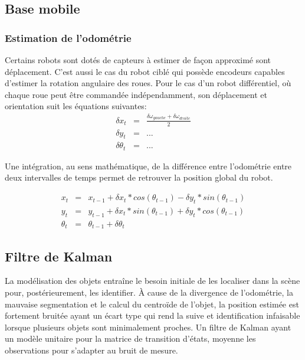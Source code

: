 \subsection{Base mobile}

\subsubsection{Estimation de l'odométrie}

Certains robots sont dotés de capteurs à estimer de façon
approximé sont déplacement. C'est aussi le cas du robot ciblé qui
possède encodeurs capables d'estimer la rotation angulaire des
roues. Pour le cas d'un robot différentiel, où chaque roue peut être
commandée indépendamment, son déplacement et orientation suit les équations suivantes:
\begin{equation*}
	\begin{array}{rcl}
		\delta x_t &=& \frac{\delta \omega_{gauche} + \delta \omega_{droite}}{2} \\
		\delta y_t &=& ...\\
		\delta \theta_t &=& ...								
	\end{array}
\end{equation*}

Une intégration, au sens mathématique, de la différence entre
l'odométrie entre deux intervalles de temps permet de retrouver la
position global du robot.

\begin{equation*}
	\begin{array}{rcl}
		x_t &=& x_{t-1} + \delta x_{t} * cos(\theta_{t-1}) - \delta y_{t} * sin(\theta_{t-1}) \\
		y_t &=& y_{t-1} + \delta x_{t} * sin(\theta_{t-1}) + \delta y_{t} * cos(\theta_{t-1}) \\
		\theta_t &=& \theta_{t-1} + \delta\theta_{t}
	\end{array}
\end{equation*}

\subsection{Filtre de Kalman }

La modélisation des objets entraîne le besoin initiale de les
localiser dans la scène pour, postérieurement, les identifier. À cause
de la divergence de l'odométrie, la mauvaise segmentation et le calcul
du centroïde de l'objet, la position estimée est fortement bruitée
ayant un écart type qui rend la suive et identification infaisable
lorsque plusieurs objets sont minimalement proches. Un filtre de
Kalman ayant un modèle unitaire pour la matrice de transition d'états,
moyenne les observations pour s'adapter au bruit de mesure.

